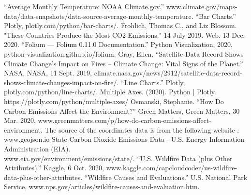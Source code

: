\documentclass[fontsize=11pt]{article}
\begin{document}
\noindent“Average Monthly Temperature: NOAA Climate.gov.” www.climate.gov/maps-data/data-snapshots/data-source-average-monthly-temperature. 
\newline
\newline
“Bar Charts.” Plotly, plotly.com/python/bar-charts/. 
\newline
\newline
Frohlich, Thomas C., and Liz Blossom. "These Countries Produce the Most CO2 Emissions." 14 July 2019. Web. 13 Dec. 2020. 
\newline
\newline
“Folium — Folium 0.11.0 Documentation.” Python Visualization, 2020, python-visualization.github.io/folium. 
\newline
\newline
Gray, Ellen. “Satellite Data Record Shows Climate Change's Impact on Fires – Climate Change: Vital Signs of the Planet.” NASA, NASA, 11 Sept. 2019, climate.nasa.gov/news/2912/satellite-data-record-shows-climate-changes-impact-on-fire/. 
\newline
\newline
 “Line Charts.” Plotly, plotly.com/python/line-charts/. 
\newline
\newline
Multiple Axes. (2020). Python | Plotly. https://plotly.com/python/multiple-axes/
\newline
\newline
Osmanski, Stephanie. “How Do Carbon Emissions Affect the Environment?” Green Matters, Green Matters, 30 Mar. 2020, www.greenmatters.com/p/how-do-carbon-emissions-affect-environment. 
\newline
\newline
The source of the coordinates data is from the following website : www.geojson.io
\newline
\newline
State Carbon Dioxide Emissions Data - U.S. Energy Information Administration (EIA). \\ www.eia.gov/environment/emissions/state/. 
\newline
\newline
“U.S. Wildfire Data (plus Other Attributes).” Kaggle, 6 Oct. 2020, www.kaggle.com/capcloudcoder/us-wildfire-data-plus-other-attributes.
\newline
\newline
“Wildfire Causes and Evaluations.” U.S. National Park Service, www.nps.gov/articles/wildfire-causes-and-evaluation.htm. 
\newpage
\end{document}
